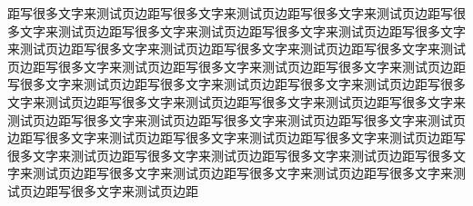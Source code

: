 距写很多文字来测试页边距写很多文字来测试页边距写很多文字来测试页边距写很多文字来测试页边距写很多文字来测试页边距写很多文字来测试页边距写很多文字来测试页边距写很多文字来测试页边距写很多文字来测试页边距写很多文字来测试页边距写很多文字来测试页边距写很多文字来测试页边距写很多文字来测试页边距写很多文字来测试页边距写很多文字来测试页边距写很多文字来测试页边距写很多文字来测试页边距写很多文字来测试页边距写很多文字来测试页边距写很多文字来测试页边距写很多文字来测试页边距写很多文字来测试页边距写很多文字来测试页边距写很多文字来测试页边距写很多文字来测试页边距写很多文字来测试页边距写很多文字来测试页边距写很多文字来测试页边距写很多文字来测试页边距写很多文字来测试页边距写很多文字来测试页边距写很多文字来测试页边距写很多文字来测试页边距写很多文字来测试页边距

